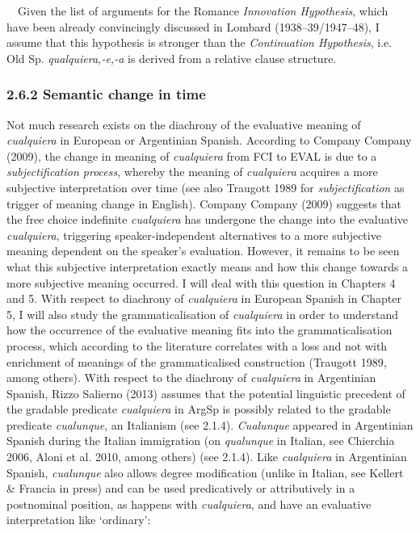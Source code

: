 \begin{styleStandard}
\ \ Given the list of arguments for the Romance \textit{Innovation Hypothesis}, which have been already convincingly discussed in Lombard (1938–39/1947–48), I assume that this hypothesis is stronger than the \textit{Continuation Hypothesis}, i.e. Old Sp.\textbf{\textit{ }}\textit{qualquiera,-e,-a}\textbf{ }is derived from a relative clause structure.
\end{styleStandard}

\subsubsection[2.6.2 Semantic change in time]{\textbf{2.6.2 Semantic change in time}}
\begin{styleStandard}
Not much research exists on the diachrony of the evaluative meaning of \textit{cualquiera} in European or Argentinian Spanish. According to Company Company (2009), the change in meaning of \textit{cualquiera} from FCI to EVAL is due to a \textit{subjectification process}, whereby the meaning of \textit{cualquiera} acquires a more subjective interpretation over time (see also Traugott 1989 for \textit{subjectification} as trigger of meaning change in English). Company Company (2009) suggests that the free choice indefinite \textit{cualquiera} has undergone the change into the evaluative \textit{cualquiera}, triggering speaker-independent alternatives to a more subjective meaning dependent on the speaker’s evaluation. However, it remains to be seen what this subjective interpretation exactly means and how this change towards a more subjective meaning occurred. I will deal with this question in Chapters 4 and 5. With respect to diachrony of \textit{cualquiera} in European Spanish in Chapter 5, I will also study the grammaticalisation of \textit{cualquiera} in order to understand how the occurrence of the evaluative meaning fits into the grammaticalisation process, which according to the literature correlates with a loss and not with enrichment of meanings of the grammaticalised construction (Traugott 1989, among others). With respect to the diachrony of \textit{cualquiera} in Argentinian Spanish, Rizzo Salierno (2013) assumes that the potential linguistic precedent of the gradable predicate \textit{cualquiera} in ArgSp is possibly related to the gradable predicate \textit{cualunque}, an Italianism (see 2.1.4). \textit{Cualunque} appeared in Argentinian Spanish during the Italian immigration (on \textit{qualunque} in Italian, see Chierchia 2006, Aloni et al. 2010, among others) (see 2.1.4). Like \textit{cualquiera} in Argentinian Spanish, \textit{cualunque} also allows degree modification (unlike in Italian, see Kellert \& Francia in press) and can be used predicatively or attributively in a postnominal position, as happens with \textit{cualquiera}, and have an evaluative interpretation like ‘ordinary’:
\end{styleStandard}

